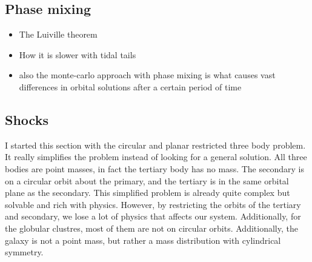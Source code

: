     \subsection{Phase mixing}
        \begin{itemize}
            \item The Luiville theorem
            \item How it is slower with tidal tails 
            \item also the monte-carlo approach with phase mixing is what causes vast differences in orbital solutions after a certain period of time 
        \end{itemize}
    
    \subsection{Shocks}
        I started this section with the circular and planar restricted three body problem. It really simplifies the problem instead of looking for a general solution. All three bodies are point masses, in fact the tertiary body has no mass. The secondary is on a circular orbit about the primary, and the tertiary is in the same orbital plane as the secondary. This simplified problem is already quite complex but solvable and rich with physics. However, by restricting the orbits of the tertiary and secondary, we lose a lot of physics that affects our system. Additionally, for the globular clustres, most of them are not on circular orbits. Additionally, the galaxy is not a point mass, but rather a mass distribution with cylindrical symmetry.